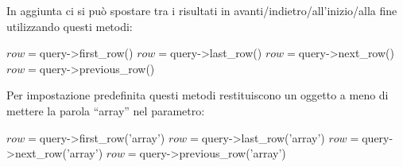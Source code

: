\begin{itemize}
In aggiunta ci si può spostare tra i risultati in avanti/indietro/all'inizio/alla fine utilizzando questi metodi:

\begin{code}
$row = $query->first_row()
$row = $query->last_row()
$row = $query->next_row()
$row = $query->previous_row()
\end{code}

Per impostazione predefinita questi metodi restituiscono un oggetto a meno di mettere la parola ``array'' nel parametro:

\begin{code}
$row = $query->first_row('array')
$row = $query->last_row('array')
$row = $query->next_row('array')
$row = $query->previous_row('array')
\end{code}
\end{itemize}

